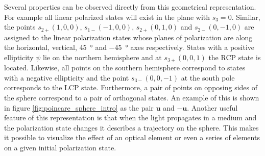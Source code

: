 Several properties can be observed directly from this geometrical representation. For example all linear polarized states will exist in the plane with $s_3=0$. Similar, the points $s_{2+}(1,0,0)$, $s_{1-}(-1,0,0)$, $s_{2+}(0,1,0)$ and $s_{2-}(0,-1,0)$ are assigned to the linear polarization states whose planes of polarization are along the horizontal, vertical, \SI{+45}{\degree} and \SI{-45}{\degree} axes respectively. States with a positive ellipticity $\psi$ lie on the northern hemisphere and at $s_{3+}(0,0,1)$ the RCP state is located. Likewise, all points on the southern hemisphere correspond to states with a negative ellipticity and the point $s_{3-}(0,0,-1)$ at the south pole corresponds to the LCP state. Furthermore, a pair of points on opposing sides of the sphere correspond to a pair of orthogonal states. An example of this is shown in figure \ref{fig:poincare_sphere_intro} as the pair $\bm{u}$ and $-\bm{u}$. Another useful feature of this representation is that when the light propagates in a medium and the polarization state changes it describes a trajectory on the sphere. This makes it possible to visualize the effect of an optical element or even a series of elements on a given initial polarization state.

